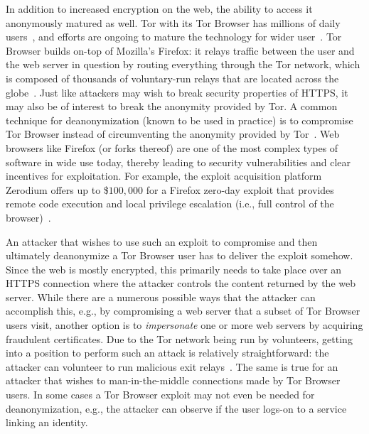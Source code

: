 In addition to increased encryption on the web, the ability to access it
anonymously matured as well.  Tor with its Tor Browser has millions of daily
users~\cite{tor,mani}, and efforts are ongoing to mature the technology 
for wider user~\cite{fftor}.  Tor Browser builds on-top of Mozilla's Firefox:
	it relays traffic between the user and the web server in question by routing
		everything through the Tor network,
	which is composed of thousands of voluntary-run relays that are located
		across the globe~\cite{relay-by-flag}.
Just like attackers may wish to break security properties of HTTPS, it may also
be of interest to break the anonymity provided by Tor.  A common technique for
deanonymization (known to be used in practice) is to compromise Tor
Browser instead of circumventing the anonymity provided by
Tor~\cite{selfrando,lepop1,lepop2,zerotor}.  Web browsers like Firefox
(or forks thereof) are one of the most complex types of software in wide use
today, thereby leading to security vulnerabilities and clear incentives for
exploitation.  For example, the exploit acquisition platform Zerodium offers up
to \$$100,000$ for a Firefox zero-day exploit that provides remote code
execution and local privilege escalation (i.e., full control of the
browser)~\cite{zeromain}.

An attacker that wishes to use such an exploit to compromise and then ultimately
deanonymize a Tor Browser user has to deliver the exploit somehow.  Since the
web is mostly encrypted, this primarily needs to take place over an HTTPS
connection where the attacker controls the content returned by the web server.
While there are a numerous possible ways that the attacker can accomplish this,
e.g., by compromising a web server that a subset of Tor Browser users visit,
another option is to \emph{impersonate} one or more web servers by acquiring
fraudulent certificates. Due to the Tor network being run by volunteers, getting
into a position to perform such an attack is relatively straightforward:
	the attacker can volunteer to run malicious exit
		relays~\cite{spoiled-onions}.
The same is true for an attacker that wishes to man-in-the-middle connections
made by Tor Browser users.  In some cases a Tor Browser exploit may not even be
needed for deanonymization, e.g., the attacker can observe if the user logs-on
to a service linking an identity.

